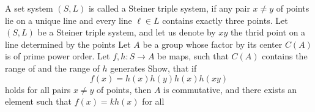 A set system $ (S,L)$ is called a Steiner triple system, if  any pair  $ x\neq y$ of points lie on a unique line  and every line $ \ell\in L$ contains exactly three points. Let $ (S,L)$ be a Steiner triple system, and let us denote by $ xy$ the thrid point on a line determined by the points  Let $ A$ be a group whose factor by its center $ C(A)$ is of prime power order. Let $ f,h: S\to A$ be maps, such that $ C(A)$ contains the range of  and the range of $ h$ generates 
Show, that if
\[ f(x) = h(x)h(y)h(x)h(xy)\]
holds for all pairs $ x\neq y$ of points, then $ A$ is commutative, and there exists an element  such that $ f(x) = kh(x)$ for all 